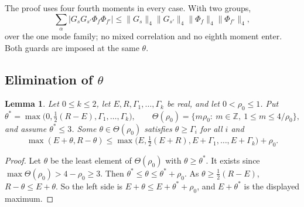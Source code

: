 \documentclass{amsart}
\newtheorem{lemma}{Lemma}[section]
\theoremstyle{definition}
\theoremstyle{plain}
\numberwithin{equation}{section}
\numberwithin{table}{section}
\begin{document}
The proof uses four fourth moments in every case. With two groups,
\[
 \sum_\alpha|G_{s}G_{s'}\Phi_f\Phi_{f'}|\le
 \|G_s\|_4\|G_{s'}\|_4\|\Phi_f\|_4\|\Phi_{f'}\|_4 ,
\]
over the one mode family; no mixed correlation and no eighth moment enter.
Both guards are imposed at the same $\theta$.

\subsection{Elimination of \texorpdfstring{$\theta$}{theta}}\label{sec:pow3:elim}

\begin{lemma}\label{lem:pw:elim}
Let $0\le k\le2$, let $E,R,\Gamma_1,\dots,\Gamma_k$ be real, and let
$0<\rho_0\le1$. Put
\[
 \theta^*=\max\bigl(0,\tfrac12(R-E),\Gamma_1,\dots,\Gamma_k\bigr),\qquad
 \Theta(\rho_0)=\{m\rho_0:\ m\in\mathbb Z,\ 1\le m\le4/\rho_0\},
\]
and assume $\theta^*\le3$.
Some $\theta\in\Theta(\rho_0)$ satisfies $\theta\ge\Gamma_i$ for all $i$ and
\[
 \max(E+\theta,R-\theta)\le\max\bigl(E,\tfrac12(E+R),E+\Gamma_1,\dots,E+\Gamma_k\bigr)+\rho_0 .
\]
\end{lemma}

\begin{proof}
Let $\theta$ be the least element of $\Theta(\rho_0)$ with $\theta\ge\theta^*$.
It exists since $\max\Theta(\rho_0)>4-\rho_0\ge3$. Then
$\theta^*\le\theta\le\theta^*+\rho_0$. As $\theta\ge\frac12(R-E)$,
$R-\theta\le E+\theta$. So the left side is
$E+\theta\le E+\theta^*+\rho_0$, and $E+\theta^*$ is the displayed maximum.
\end{proof}
\end{document}
